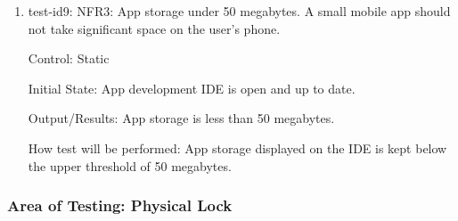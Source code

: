 \documentclass[12pt, titlepage]{article}
\begin{document}
\begin{enumerate}
\item{test-id9: NFR3: App storage under 50 megabytes. A small mobile app should not take significant space on the user’s phone.  \\}

Control: Static 

Initial State: App development IDE is open and up to date.

Output/Results: App storage is less than 50 megabytes.

How test will be performed: App storage displayed on the IDE is kept below the upper threshold of 50 megabytes. 

\end{enumerate}

\subsubsection{Area of Testing: Physical Lock}
\end{document}
